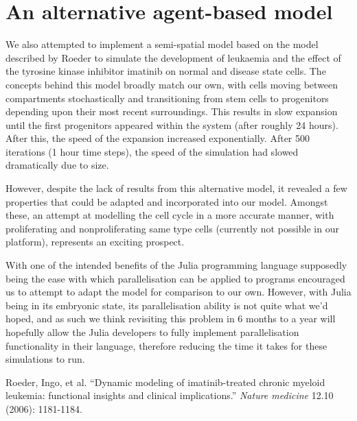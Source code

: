 \documentclass[12pt,a4paper]{report}
\begin{document}
\newpage

\section{An alternative agent-based model}

We also attempted to implement a semi-spatial model based on the model 
described by Roeder to simulate the development of leukaemia and the 
effect of the tyrosine kinase inhibitor imatinib on normal and disease 
state cells. The concepts behind this model broadly match our own, with 
cells moving between compartments stochastically and transitioning from 
stem cells to progenitors depending upon their most recent surroundings. 
This results in slow expansion until the first progenitors appeared 
within the system (after roughly 24 hours). After this, the speed of the 
expansion increased exponentially. After 500 iterations (1 hour time 
steps), the speed of the simulation had slowed dramatically due to size.

However, despite the lack of results from this alternative model, it 
revealed a few properties that could be adapted and incorporated into 
our model. Amongst these, an attempt at modelling the cell cycle in a 
more accurate manner, with proliferating and nonproliferating same type 
cells (currently not possible in our platform), represents an exciting 
prospect.

With one of the intended benefits of the Julia programming language 
supposedly being the ease with which parallelisation can be applied to 
programs encouraged us to attempt to adapt the model for comparison to 
our own. However, with Julia being in its embryonic state, its 
parallelisation ability is not quite what we'd hoped, and as such we 
think revisiting this problem in 6 months to a year will hopefully allow 
the Julia developers to fully implement parallelisation functionality in 
their language, therefore reducing the time it takes for these 
simulations to run.


\newpage

\begin{thebibliography}{9}
  Roeder, Ingo, et al. ``Dynamic modeling of imatinib-treated chronic myeloid leukemia: functional insights and clinical implications.'' {\itshape Nature medicine} 12.10 (2006): 1181-1184.
\end{thebibliography}
\newpage

\end{document}
